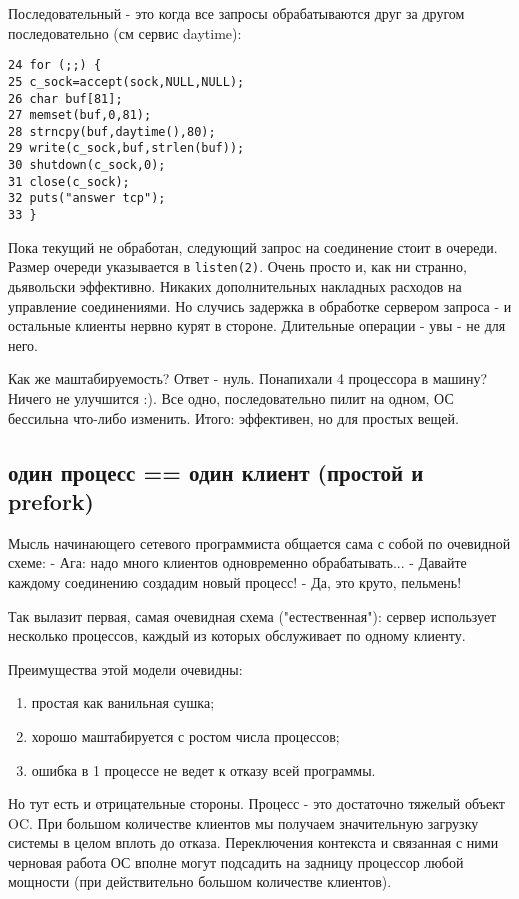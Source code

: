 Последовательный - это когда все запросы обрабатываются друг за другом последовательно (см сервис daytime):
\begin{verbatim}
24 for (;;) {
25 c_sock=accept(sock,NULL,NULL);
26 char buf[81];
27 memset(buf,0,81);
28 strncpy(buf,daytime(),80);
29 write(c_sock,buf,strlen(buf));
30 shutdown(c_sock,0);
31 close(c_sock);
32 puts("answer tcp");
33 }
\end{verbatim}

Пока текущий не обработан, следующий запрос на соединение стоит в очереди. Размер очереди указывается в \verb+listen(2)+.
Очень просто и, как ни странно, дьявольски эффективно. Никаких дополнительных накладных расходов на управление соединениями. Но случись задержка в обработке сервером запроса - и остальные клиенты нервно курят в стороне. Длительные операции - увы - не для него.

Как же маштабируемость? Ответ - нуль. Понапихали 4 процессора в машину? Ничего не улучшится :). Все одно, последовательно пилит на одном, ОС бессильна что-либо изменить.
Итого: эффективен, но для простых вещей.

\subsection{один процесс == один клиент (простой и prefork)}

Мысль начинающего сетевого программиста общается сама с собой по очевидной схеме:\newline
- Ага: надо много клиентов одновременно обрабатывать...\newline
- Давайте каждому соединению создадим новый процесс!\newline
- Да, это круто, пельмень!

Так вылазит первая, самая очевидная схема ("естественная"): сервер использует несколько процессов, каждый из которых обслуживает по одному клиенту.

Преимущества этой модели очевидны:
\begin{enumerate}
\item простая как ванильная сушка;
\item хорошо маштабируется с ростом числа процессов;
\item ошибка в 1 процессе не ведет к отказу всей программы.
\end{enumerate}

Но тут есть и отрицательные стороны. Процесс - это достаточно тяжелый объект OC. При большом количестве клиентов мы получаем значительную загрузку системы в целом вплоть до отказа. Переключения контекста и связанная с ними черновая работа ОС вполне могут подсадить на задницу процессор любой мощности (при действительно большом количестве клиентов).

